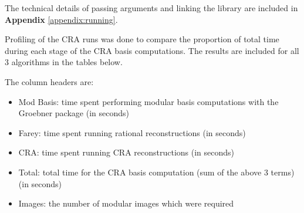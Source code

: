 \documentclass[letterpaper,12pt,titlepage,oneside,final]{book}
\begin{document}
The technical details of passing arguments and linking the library are included in \textbf{Appendix} \ref{appendix:running}.  

Profiling of the CRA runs was done to compare the proportion of total time during each stage of the CRA basis computations.  The results are included for all 3 algorithms in the tables below.  

The column headers are:
\begin{itemize}
  \item Mod Basis: time spent performing modular basis computations with the Groebner package (in seconds)
  \item Farey: time spent running rational reconstructions (in seconds)
  \item CRA: time spent running CRA reconstructions (in seconds)
  \item Total: total time for the CRA basis computation (sum of the above 3 terms) (in seconds)
  \item Images: the number of modular images which were required
\end{itemize} 
\end{document}
